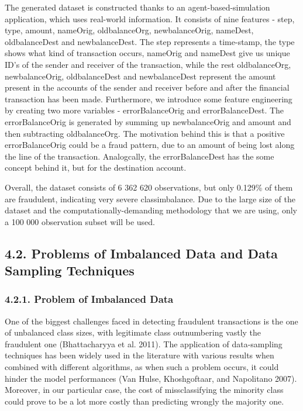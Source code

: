 \documentclass[12pt,]{article}
\begin{document}
The generated dataset is constructed thanks to an agent-based-simulation
application, which uses real-world information. It consists of nine
features - step, type, amount, nameOrig, oldbalanceOrg, newbalanceOrig,
nameDest, oldbalanceDest and newbalanceDest. The step represents a
time-stamp, the type shows what kind of transaction occurs, nameOrig and
nameDest give us unique ID's of the sender and receiver of the
transaction, while the rest oldbalanceOrg, newbalanceOrig,
oldbalanceDest and newbalanceDest represent the amount present in the
accounts of the sender and receiver before and after the financial
transaction has been made. Furthermore, we introduce some feature
engineering by creating two more variables - errorBalanceOrig and
errorBalanceDest. The errorBalanceOrig is generated by summing up
newbalanceOrig and amount and then subtracting oldbalanceOrg. The
motivation behind this is that a positive errorBalanceOrig could be a
fraud pattern, due to an amount of being lost along the line of the
transaction. Analogcally, the errorBalanceDest has the some concept
behind it, but for the destination account.

Overall, the dataset consists of 6 362 620 observations, but only
0.129\% of them are fraudulent, indicating very severe classimbalance.
Due to the large size of the dataset and the computationally-demanding
methodology that we are using, only a 100 000 observation subset will be
used.

\hypertarget{problems-of-imbalanced-data-and-data-sampling-techniques}{%
\subsection{4.2. Problems of Imbalanced Data and Data Sampling
Techniques}\label{problems-of-imbalanced-data-and-data-sampling-techniques}}

\hypertarget{problem-of-imbalanced-data}{%
\subsubsection{4.2.1. Problem of Imbalanced
Data}\label{problem-of-imbalanced-data}}

One of the biggest challenges faced in detecting fraudulent transactions
is the one of unbalanced class sizes, with legitimate class outnumbering
vastly the fraudulent one (Bhattacharyya et al. 2011). The application
of data-sampling techniques has been widely used in the literature with
various results when combined with different algorithms, as when such a
problem occurs, it could hinder the model performances (Van Hulse,
Khoshgoftaar, and Napolitano 2007). Moreover, in our particular case,
the cost of missclassifying the minority class could prove to be a lot
more costly than predicting wrongly the majority one.
\end{document}
